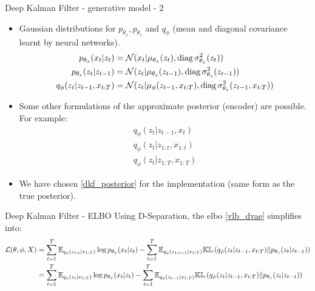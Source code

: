 \begin{frame}{Deep Kalman Filter - generative model - 2}
\begin{itemize}
    \item Gaussian distributions for $p_{\theta_x}, p_{\theta_z}$ and $q_\phi$ (mean and diagonal covariance learnt by neural networks).
        \begin{align}
            p_{\theta_x}(x_t \vert z_t) &= \mathcal{N}( x_t \vert \mu_{\theta_x}(z_t), \text{diag}\, \sigma_{\theta_x}^2(z_t))\\
            p_{\theta_z}(z_t \vert z_{t-1}) &= \mathcal{N}( z_t \vert \mu_{\theta_z}(z_{t-1}), \text{diag}\, \sigma_{\theta_z}^2(z_{t-1}))\\
            q_{\phi}(z_t \vert z_{t-1}, x_{t:T}) &= \mathcal{N}( z_t \vert \mu_{\phi}(z_{t-1}, x_{t:T}), \text{diag}\, \sigma_{\theta_z}^2(z_{t-1},x_{t:T}))
        \end{align}
    \item Some other formulations of the approximate posterior (encoder) are possible. For example:
        \begin{align*}
            q_{\phi}(z_t \vert z_{t-1}, x_t) \\
            q_{\phi}(z_t \vert z_{1:t}, x_{1:t}) \\
            q_{\phi}(z_t \vert z_{1:T}, x_{1:T})
        \end{align*}
    \item We have chosen \ref{dkf_posterior} for the implementation (same form as the true posterior).
\end{itemize}
\end{frame}

\begin{frame}{Deep Kalman Filter - ELBO}
Using D-Separation, the \gls{elbo} \ref{vlb_dvae} simplifies into:
\begin{align}
    \mathcal{L}(\theta, \phi, X) &= \sum_{t=1}^T \mathbb{E}_{q_\phi(z_{1:t} \vert x_{1:T})} \log{p_{\theta_x}(x_t \vert z_t)} - \sum_{t=1}^T \mathbb{E}_{q_\phi(z_{1:t-1} \vert x_{1:T})} \mathbb{KL}\left( q_{\phi}(z_t \vert z_{t-1}, x_{t:T}) \vert\vert p_{\theta_z}(z_t \vert z_{t-1}) \right) \\
    &= \sum_{t=1}^T \mathbb{E}_{q_\phi(z_{t} \vert x_{1:T})} \log{p_{\theta_x}(x_t \vert z_t)} - \sum_{t=1}^T \mathbb{E}_{q_\phi(z_{t-1} \vert x_{1:T})} \mathbb{KL}\left( q_{\phi}(z_t \vert z_{t-1}, x_{t:T}) \vert\vert p_{\theta_z}(z_t \vert z_{t-1}) \right)
\end{align}
\end{frame}

